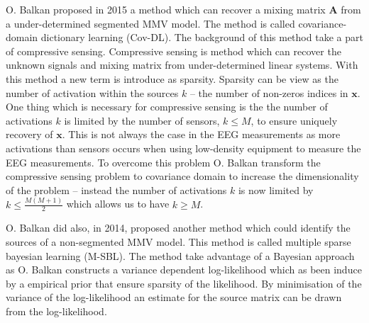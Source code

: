 O. Balkan \cite{Balkan2015} proposed in 2015 a method which can recover a mixing matrix $\mathbf{A}$ from a under-determined segmented MMV model. 
The method is called covariance-domain dictionary learning (Cov-DL).
The background of this method take a part of compressive sensing. 
Compressive sensing is method which can recover the unknown signals and mixing matrix from under-determined linear systems. 
With this method a new term is introduce as sparsity. Sparsity can be view as the number of activation within the sources $k$ -- the number of non-zeros indices in $\mathbf{x}$.
One thing which is necessary for compressive sensing is the the number of activations $k$ is limited by the number of sensors, $k \leq M$, to ensure uniquely recovery of $\mathbf{x}$.
This is not always the case in the EEG measurements as more activations than sensors occurs when using low-density equipment to measure the EEG measurements.
To overcome this problem O. Balkan transform the compressive sensing problem to covariance domain to increase the dimensionality of the problem -- instead the number of activations $k$ is now limited by $k \leq \frac{M(M+1)}{2}$ which allows us to have $k \geq M$.

O. Balkan \cite{Balkan2014} did also, in 2014, proposed another method which could identify the sources of a non-segmented MMV model. 
This method is called multiple sparse bayesian learning (M-SBL).
The method take advantage of a Bayesian approach as O. Balkan constructs a variance dependent log-likelihood which as been induce by a empirical prior that ensure sparsity of the likelihood. 
By minimisation of the variance of the log-likelihood an estimate for the source matrix can be drawn from the log-likelihood.



